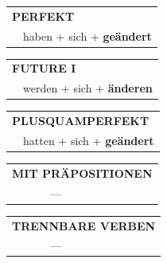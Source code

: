 \documentclass[10pt,a4paper]{revtex4-2}
\begin{document}
\begin{verbbox-acc}
 \begin{tabular}{rl}
     \multicolumn{2}{l}{\textbf{PERFEKT}}\\
    &haben + sich + \textbf{geändert}\\
  \end{tabular}
\hfill
   \begin{tabular}{rl}
   
    \multicolumn{2}{l}{\textbf{FUTURE I} }\\
    &werden + sich + \textbf{änderen}\\
 
  \end{tabular}
\hfill
   \begin{tabular}{rl}
      \multicolumn{2}{l}{\textbf{PLUSQUAMPERFEKT}}\\
    &hatten + sich + \textbf{geändert}\\
  \end{tabular}
  
  
\vspace{10pt}

\begin{tabular}{lll}
\multicolumn{3}{l}{\textbf{MIT PRÄPOSITIONEN}}\\
& ---\\
\end{tabular}
\hfill
\begin{tabular}{lll}
\multicolumn{3}{l}{\textbf{TRENNBARE VERBEN}}\\
& ---\\
\end{tabular}

\vspace{-5pt}

\end{verbbox-acc}
\end{document}
